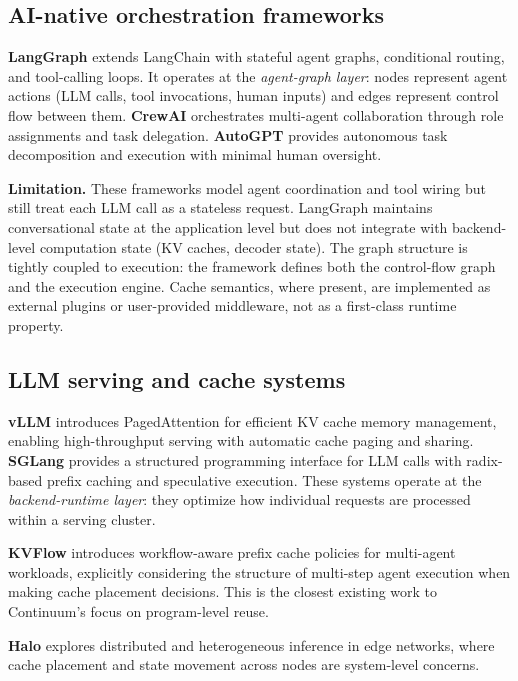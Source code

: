 \documentclass[10pt,twocolumn]{article}
\begin{document}
\subsection{AI-native orchestration frameworks}

\textbf{LangGraph} \cite{langgraph2024docs} extends LangChain \cite{langchain2024docs} with stateful agent graphs, conditional routing, and tool-calling loops. It operates at the \emph{agent-graph layer}: nodes represent agent actions (LLM calls, tool invocations, human inputs) and edges represent control flow between them. \textbf{CrewAI} \cite{crewai2024docs} orchestrates multi-agent collaboration through role assignments and task delegation. \textbf{AutoGPT} \cite{autogpt2024docs} provides autonomous task decomposition and execution with minimal human oversight.

\textbf{Limitation.} These frameworks model agent coordination and tool wiring but still treat each LLM call as a stateless request. LangGraph maintains conversational state at the application level but does not integrate with backend-level computation state (KV caches, decoder state). The graph structure is tightly coupled to execution: the framework defines both the control-flow graph and the execution engine. Cache semantics, where present, are implemented as external plugins or user-provided middleware, not as a first-class runtime property.

\subsection{LLM serving and cache systems}

\textbf{vLLM} \cite{kwon2023pagedattention} introduces PagedAttention for efficient KV cache memory management, enabling high-throughput serving with automatic cache paging and sharing. \textbf{SGLang} \cite{zheng2024sglang} provides a structured programming interface for LLM calls with radix-based prefix caching and speculative execution. These systems operate at the \emph{backend-runtime layer}: they optimize how individual requests are processed within a serving cluster.

\textbf{KVFlow} \cite{pan2025kvflow} introduces workflow-aware prefix cache policies for multi-agent workloads, explicitly considering the structure of multi-step agent execution when making cache placement decisions. This is the closest existing work to Continuum's focus on program-level reuse.

\textbf{Halo} \cite{li2026halo} explores distributed and heterogeneous inference in edge networks, where cache placement and state movement across nodes are system-level concerns.
\end{document}
